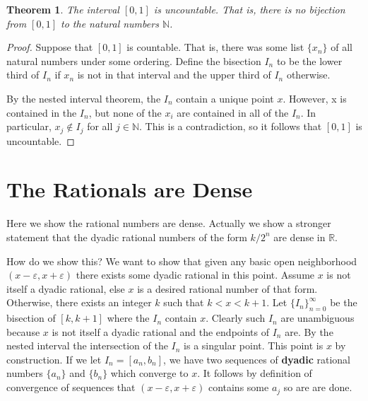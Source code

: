 \documentclass[12pt]{article}
\theoremstyle{definition}
\theoremstyle{plain}
\newtheorem{thm}{Theorem}
\begin{document}
\begin{thm}
The interval $[0, 1]$ is uncountable. That is, there is no bijection from $[0, 1]$ to the natural numbers $\mathbb{N}$.
\end{thm}

\begin{proof}
Suppose that $[0, 1]$ is countable. That is, there was some list $\{x_n\}$ of all natural numbers under some ordering. Define the bisection $I_n$ to be the lower third of $I_n$ if $x_n$ is not in that interval and the upper third of $I_n$ otherwise.

By the nested interval theorem, the $I_n$ contain a unique point $x$. However, x is contained in the $I_n$, but none of the $x_i$ are contained in all of the $I_n$. In particular, $x_j \not\in I_j$ for all $j \in \mathbb{N}$. This is a contradiction, so it follows that $[0, 1]$ is uncountable.
\end{proof}

\section{The Rationals are Dense}

Here we show the rational numbers are dense. Actually we show a stronger statement that the dyadic rational numbers of the form $k/2^n$ are dense in $\mathbb{R}$.

How do we show this? We want to show that given any basic open neighborhood $(x - \varepsilon, x + \varepsilon)$ there exists some dyadic rational in this point. Assume $x$ is not itself a dyadic rational, else $x$ is a desired rational number of that form. Otherwise, there exists an integer $k$ such that $k < x < k + 1$. Let $\{I_n\}_{n = 0}^\infty$ be the bisection of $[k, k + 1]$ where the $I_n$ contain $x$. Clearly such $I_n$ are unambiguous because $x$ is not itself a dyadic rational and the endpoints of $I_n$ are. By the nested interval the intersection of the $I_n$ is a singular point. This point is $x$ by construction. If we let $I_n = [a_n, b_n]$, we have two sequences of \textbf{dyadic} rational numbers $\{a_n\}$ and $\{b_n\}$ which converge to $x$. It follows by definition of convergence of sequences that $(x - \varepsilon, x + \varepsilon)$ contains some $a_j$ so are are done.
\end{document}
